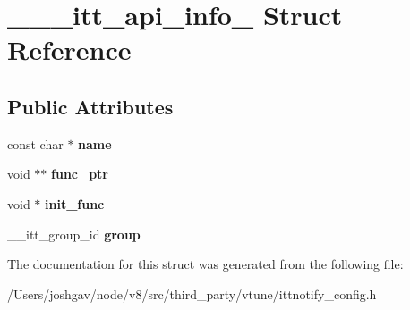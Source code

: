 \hypertarget{struct______itt__api__info__20101001}{}\section{\+\_\+\+\_\+\+\_\+itt\+\_\+api\+\_\+info\+\_ Struct Reference}
\label{struct______itt__api__info__20101001}
\subsection*{Public Attributes}
\begin{DoxyCompactItemize}
\item 
const char $\ast$ {\bfseries name}\hypertarget{struct______itt__api__info__20101001_a8e9d10c3041b72e1ea0355b40ee772a5}{}\label{struct______itt__api__info__20101001_a8e9d10c3041b72e1ea0355b40ee772a5}

\item 
void $\ast$$\ast$ {\bfseries func\+\_\+ptr}\hypertarget{struct______itt__api__info__20101001_a3055f1f3a553efe6059d674987e0b2e8}{}\label{struct______itt__api__info__20101001_a3055f1f3a553efe6059d674987e0b2e8}

\item 
void $\ast$ {\bfseries init\+\_\+func}\hypertarget{struct______itt__api__info__20101001_a2c2825ddd464d578ab867e86f83da253}{}\label{struct______itt__api__info__20101001_a2c2825ddd464d578ab867e86f83da253}

\item 
\+\_\+\+\_\+itt\+\_\+group\+\_\+id {\bfseries group}\hypertarget{struct______itt__api__info__20101001_abd973a098fd9181d23e93fcb2a3de469}{}\label{struct______itt__api__info__20101001_abd973a098fd9181d23e93fcb2a3de469}

\end{DoxyCompactItemize}


The documentation for this struct was generated from the following file\+:\begin{DoxyCompactItemize}
\item 
/\+Users/joshgav/node/v8/src/third\+\_\+party/vtune/ittnotify\+\_\+config.\+h\end{DoxyCompactItemize}
